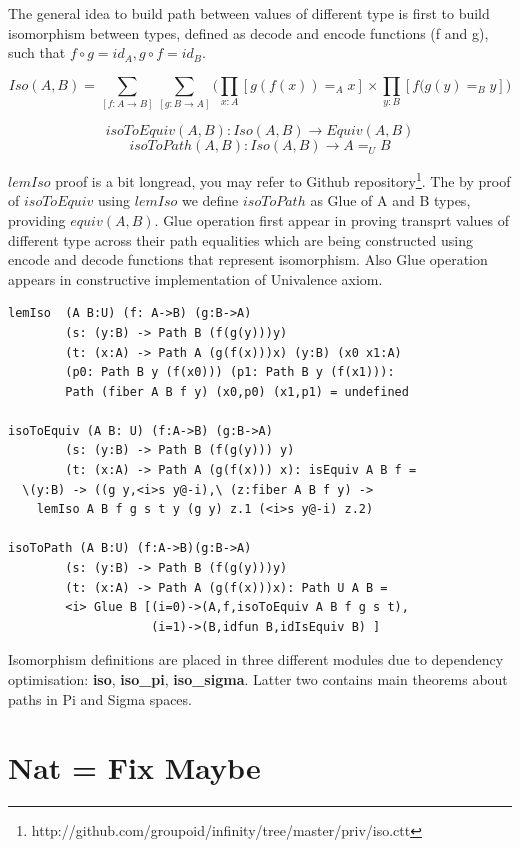 \documentclass{svproc}
\begin{document}
The general idea to build path between values of different type is first
to build isomorphism between types, defined as decode and encode functions (f and g),
such that $f \circ g = id_A, g \circ f = id_B$.

$$Iso(A,B) = \sum_{[f:A\rightarrow B]}\sum_{[g:B\rightarrow A]}\Biggl( \prod_{x:A} [ g(f(x)) =_A x ] \times \prod_{y:B} [ f(g(y) =_B y ] \Biggr)$$

$$isoToEquiv(A,B) : Iso(A,B) \rightarrow Equiv(A,B)$$
$$isoToPath(A,B) : Iso(A,B) \rightarrow A =_U B$$

$lemIso$ proof is a bit longread, you may refer to Github
repository\footnote{http://github.com/groupoid/infinity/tree/master/priv/iso.ctt}.
The by proof of $isoToEquiv$ using $lemIso$ we define $isoToPath$ as
Glue of A and B types, providing $equiv(A,B)$. Glue operation first appear in
proving transprt values of different type across their path equalities which are being constructed
using encode and decode functions that represent isomorphism. Also Glue operation
appears in constructive implementation of Univalence axiom\cite{Mortberg17}.

\begin{lstlisting}[mathescape=true]
lemIso  (A B:U) (f: A->B) (g:B->A)
        (s: (y:B) -> Path B (f(g(y)))y)
        (t: (x:A) -> Path A (g(f(x)))x) (y:B) (x0 x1:A)
        (p0: Path B y (f(x0))) (p1: Path B y (f(x1))):
        Path (fiber A B f y) (x0,p0) (x1,p1) = undefined

isoToEquiv (A B: U) (f:A->B) (g:B->A)
        (s: (y:B) -> Path B (f(g(y))) y)
        (t: (x:A) -> Path A (g(f(x))) x): isEquiv A B f =
  \(y:B) -> ((g y,<i>s y@-i),\ (z:fiber A B f y) ->
    lemIso A B f g s t y (g y) z.1 (<i>s y@-i) z.2)

isoToPath (A B:U) (f:A->B)(g:B->A)
        (s: (y:B) -> Path B (f(g(y)))y)
        (t: (x:A) -> Path A (g(f(x)))x): Path U A B =
        <i> Glue B [(i=0)->(A,f,isoToEquiv A B f g s t),
                    (i=1)->(B,idfun B,idIsEquiv B) ]
\end{lstlisting}

Isomorphism definitions are placed in three different modules due to dependency
optimisation: {\bf iso}, {\bf iso\_pi}, {\bf iso\_sigma}. Latter two contains
main theorems about paths in Pi and Sigma spaces.

\section{Nat = Fix Maybe}
\end{document}

